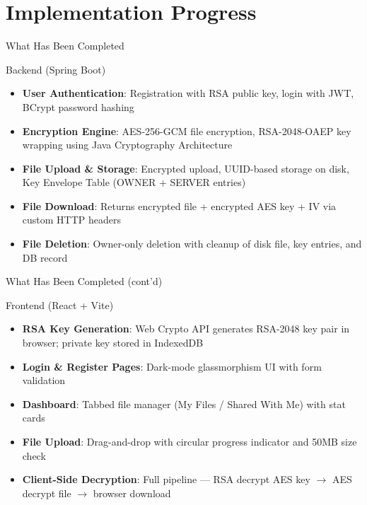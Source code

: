 \documentclass{SKP-beamer}
\begin{document}
\section{Implementation Progress}

\begin{frame}{What Has Been Completed}
\begin{block}{Backend (Spring Boot)}
\begin{itemize}
  \item \textbf{User Authentication}: Registration with RSA public key, login with JWT, BCrypt password hashing
  \item \textbf{Encryption Engine}: AES-256-GCM file encryption, RSA-2048-OAEP key wrapping using Java Cryptography Architecture
  \item \textbf{File Upload \& Storage}: Encrypted upload, UUID-based storage on disk, Key Envelope Table (OWNER + SERVER entries)
  \item \textbf{File Download}: Returns encrypted file + encrypted AES key + IV via custom HTTP headers
  \item \textbf{File Deletion}: Owner-only deletion with cleanup of disk file, key entries, and DB record
\end{itemize}
\end{block}
\end{frame}

\begin{frame}{What Has Been Completed (cont'd)}
\begin{block}{Frontend (React + Vite)}
\begin{itemize}
  \item \textbf{RSA Key Generation}: Web Crypto API generates RSA-2048 key pair in browser; private key stored in IndexedDB
  \item \textbf{Login \& Register Pages}: Dark-mode glassmorphism UI with form validation
  \item \textbf{Dashboard}: Tabbed file manager (My Files / Shared With Me) with stat cards
  \item \textbf{File Upload}: Drag-and-drop with circular progress indicator and 50MB size check
  \item \textbf{Client-Side Decryption}: Full pipeline --- RSA decrypt AES key $\rightarrow$ AES decrypt file $\rightarrow$ browser download
\end{itemize}
\end{block}
\end{frame}
\end{document}
